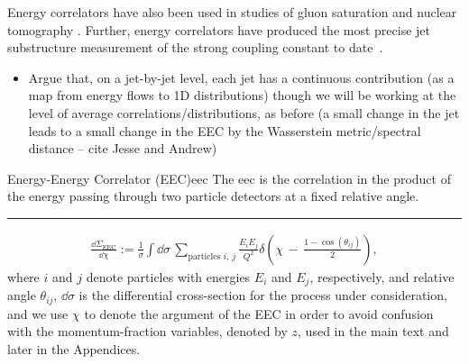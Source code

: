 

Energy correlators have also been used in studies of gluon saturation and nuclear tomography  \cite{Karapetyan:2019fst,Liu:2022wop,Liu:2023aqb,Kang:2023gvg,Cao:2023oef}.
%
Further, energy correlators have produced the most precise jet substructure measurement of the strong coupling constant to date~\cite{CMS:2024mlf}.




\begin{itemize}
    \item
    Argue that, on a jet-by-jet level, each jet has a continuous contribution (as a map from energy flows to 1D distributions) though we will be working at the level of average correlations/distributions, as before
    (a small change in the jet leads to a small change in the EEC by the Wasserstein metric/spectral distance -- cite Jesse and Andrew)
\end{itemize}




\begin{definitionbox}{Energy-Energy Correlator (EEC)}{eec}
    The \gls{eec} is the correlation in the product of the energy passing through two particle detectors at a fixed relative angle.

    \vspace{7pt}
    \hrule
    \vspace{7pt}


    \begin{align}
        \label{eq:app:EEC:def}
        \frac{\dd \Sigma_\text{EEC}}{\dd \chi}
        :=
        \frac{1}{\sigma}
        \int \dd \sigma
        \,
        \sum_{\text{particles } i,\,j}
        \frac{E_i E_j}{Q^2}
        \delta\left(\chi \, - \, \frac{1-\cos(\theta_{ij})}{2}\right)
        ,
    \end{align}
    where \(i\) and \(j\) denote particles with energies \(E_i\) and \(E_j\), respectively, and relative angle \(\theta_{ij}\), \(\dd\sigma\) is the differential cross-section for the process under consideration, and we use \(\chi\) to denote the argument of the EEC in order to avoid confusion with the momentum-fraction variables, denoted by \(z\), used in the main text and later in the Appendices.
\end{definitionbox}

